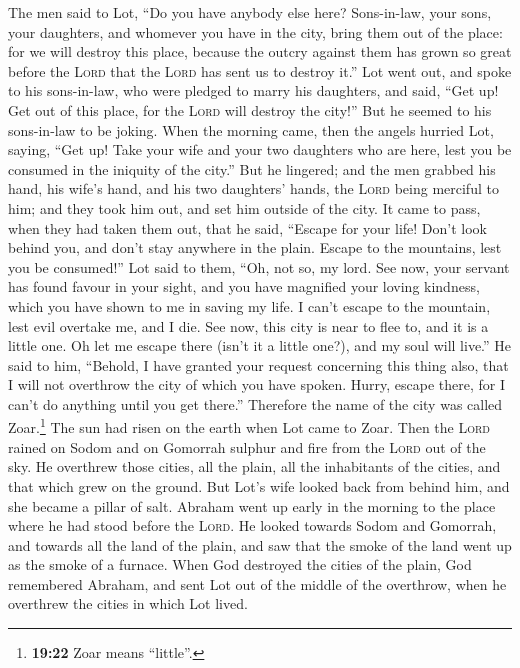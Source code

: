  The men said to Lot, ``Do you have anybody else here?
Sons-in-law, your sons, your daughters, and whomever you have in the
city, bring them out of the place:  for we will destroy
this place, because the outcry against them has grown so great before
the \textsc{Lord} that the \textsc{Lord} has sent us to destroy it.''
 Lot went out, and spoke to his sons-in-law, who were
pledged to marry his daughters, and said, ``Get up! Get out of this
place, for the \textsc{Lord} will destroy the city!'' But he seemed to
his sons-in-law to be joking.  When the morning came,
then the angels hurried Lot, saying, ``Get up! Take your wife and your
two daughters who are here, lest you be consumed in the iniquity of the
city.''  But he lingered; and the men grabbed his hand,
his wife's hand, and his two daughters' hands, the \textsc{Lord} being
merciful to him; and they took him out, and set him outside of the city.
 It came to pass, when they had taken them out, that he
said, ``Escape for your life! Don't look behind you, and don't stay
anywhere in the plain. Escape to the mountains, lest you be consumed!''
 Lot said to them, ``Oh, not so, my lord. 
See now, your servant has found favour in your sight, and you have
magnified your loving kindness, which you have shown to me in saving my
life. I can't escape to the mountain, lest evil overtake me, and I die.
 See now, this city is near to flee to, and it is a
little one. Oh let me escape there (isn't it a little one?), and my soul
will live.''  He said to him, ``Behold, I have granted
your request concerning this thing also, that I will not overthrow the
city of which you have spoken.  Hurry, escape there, for
I can't do anything until you get there.'' Therefore the name of the
city was called Zoar.\footnote{\textbf{19:22} Zoar means ``little''.}
 The sun had risen on the earth when Lot came to Zoar.
 Then the \textsc{Lord} rained on Sodom and on Gomorrah
sulphur and fire from the \textsc{Lord} out of the sky. 
He overthrew those cities, all the plain, all the inhabitants of the
cities, and that which grew on the ground.  But Lot's
wife looked back from behind him, and she became a pillar of salt.
 Abraham went up early in the morning to the place where
he had stood before the \textsc{Lord}.  He looked towards
Sodom and Gomorrah, and towards all the land of the plain, and saw that
the smoke of the land went up as the smoke of a furnace. 
When God destroyed the cities of the plain, God remembered Abraham, and
sent Lot out of the middle of the overthrow, when he overthrew the
cities in which Lot lived.

